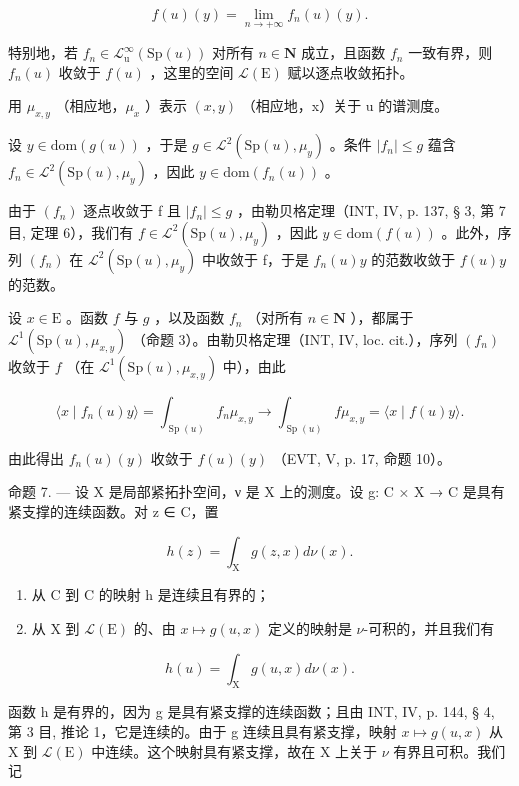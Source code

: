 \[
f (u) (y) = \lim _ {n \to + \infty} f _ {n} (u) (y).
\]

特别地，若 \(f_{n} \in \mathcal{L}_{\mathrm{u}}^{\infty}(\mathrm{Sp}(u))\) 对所有 \(n \in \mathbf{N}\) 成立，且函数 \(f_{n}\) 一致有界，则 \(f_{n}(u)\) 收敛于 \(f(u)\) ，这里的空间 \(\mathcal{L}(\mathrm{E})\) 赋以逐点收敛拓扑。

用 \(\mu_{x,y}\) （相应地，\(\mu_{x}\) ）表示 \((x,y)\) （相应地，x）关于 u 的谱测度。

设 \(y \in \mathrm{dom}(g(u))\) ，于是 \(g \in \mathcal{L}^2(\mathrm{Sp}(u), \mu_y)\) 。条件 \(|f_n| \leqslant g\) 蕴含 \(f_n \in \mathcal{L}^2(\mathrm{Sp}(u), \mu_y)\) ，因此 \(y \in \mathrm{dom}(f_n(u))\) 。

由于 \((f_{n})\) 逐点收敛于 f 且 \(|f_{n}| \leqslant g\) ，由勒贝格定理（INT, IV, p. 137, § 3, 第 7 目, 定理 6），我们有 \(f \in \mathcal{L}^{2}(\mathrm{Sp}(u), \mu_{y})\) ，因此 \(y \in \mathrm{dom}(f(u))\) 。此外，序列 \((f_{n})\) 在 \(\mathcal{L}^{2}(\mathrm{Sp}(u), \mu_{y})\) 中收敛于 f，于是 \(f_{n}(u)y\) 的范数收敛于 \(f(u)y\) 的范数。

设 \(x \in \mathrm{E}\) 。函数 \(f\) 与 \(g\) ，以及函数 \(f_n\) （对所有 \(n \in \mathbf{N}\) ），都属于 \(\mathcal{L}^1(\mathrm{Sp}(u), \mu_{x,y})\) （命题 3）。由勒贝格定理（INT, IV, loc. cit.），序列 \((f_n)\) 收敛于 \(f\) （在 \(\mathcal{L}^1(\mathrm{Sp}(u), \mu_{x,y})\) 中），由此

\[
\langle x \mid f _ {n} (u) y \rangle = \int_ {\operatorname{Sp} (u)} f _ {n} \mu_ {x, y} \rightarrow \int_ {\operatorname{Sp} (u)} f \mu_ {x, y} = \langle x \mid f (u) y \rangle .
\]

由此得出 \(f_{n}(u)(y)\) 收敛于 \(f(u)(y)\) （EVT, V, p. 17, 命题 10）。

命题 7. --- 设 X 是局部紧拓扑空间，ν 是 X 上的测度。设 g: C × X → C 是具有紧支撑的连续函数。对 z ∈ C，置

\[
h (z) = \int_ {\mathrm{X}} g (z, x) d \nu (x).
\]

\begin{enumerate}
\def\labelenumi{\alph{enumi})}
\item
  从 C 到 C 的映射 h 是连续且有界的；
\item
  从 X 到 \(\mathcal{L}(\mathrm{E})\) 的、由 \(x\mapsto g(u,x)\) 定义的映射是 \(\nu\)-可积的，并且我们有
\end{enumerate}

\[
h (u) = \int_ {\mathrm{X}} g (u, x) d \nu (x).
\]

函数 h 是有界的，因为 g 是具有紧支撑的连续函数；且由 INT, IV, p. 144, § 4, 第 3 目, 推论 1，它是连续的。由于 g 连续且具有紧支撑，映射 \(x \mapsto g(u, x)\) 从 X 到 \(\mathcal{L}(\mathrm{E})\) 中连续。这个映射具有紧支撑，故在 X 上关于 \(\nu\) 有界且可积。我们记

